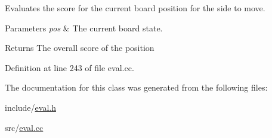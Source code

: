 Evaluates the score for the current board position for the side to move. 


\begin{DoxyParams}{Parameters}
{\em pos} & The current board state. \\
\hline
\end{DoxyParams}
\begin{DoxyReturn}{Returns}
The overall score of the position 
\end{DoxyReturn}


Definition at line 243 of file eval.\+cc.



The documentation for this class was generated from the following files\+:\begin{DoxyCompactItemize}
\item 
include/\mbox{\hyperlink{eval_8h}{eval.\+h}}\item 
src/\mbox{\hyperlink{eval_8cc}{eval.\+cc}}\end{DoxyCompactItemize}

